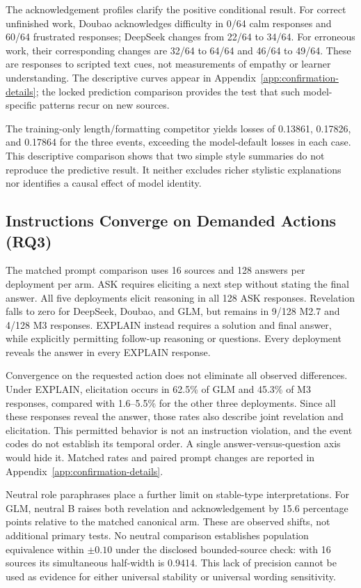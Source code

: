 The acknowledgement profiles clarify the positive conditional result. For
correct unfinished work, Doubao acknowledges difficulty in 0/64 calm responses
and 60/64 frustrated responses; DeepSeek changes from 22/64 to 34/64.
For erroneous work, their corresponding changes are 32/64 to 64/64 and
46/64 to 49/64. These are responses to scripted text cues, not measurements
of empathy or learner understanding. The descriptive curves appear in
Appendix~\ref{app:confirmation-details}; the locked prediction comparison
provides the test that such model-specific patterns recur on new sources.

The training-only length/formatting competitor yields losses of 0.13861,
0.17826, and 0.17864 for the three events, exceeding the model-default losses
in each case. This descriptive comparison shows that two simple style summaries
do not reproduce the predictive result. It neither excludes richer stylistic
explanations nor identifies a causal effect of model identity.

\subsection{Instructions Converge on Demanded Actions (RQ3)}

The matched prompt comparison uses 16 sources and 128 answers per deployment
per arm. ASK requires eliciting a next step without stating the final answer.
All five deployments elicit reasoning in all 128 ASK responses. Revelation
falls to zero for DeepSeek, Doubao, and GLM, but remains in 9/128 M2.7 and
4/128 M3 responses. EXPLAIN instead requires a solution and final answer,
while explicitly permitting follow-up reasoning or questions. Every deployment
reveals the answer in every EXPLAIN response.

Convergence on the requested action does not eliminate all observed differences.
Under EXPLAIN, elicitation occurs in 62.5\% of GLM and 45.3\% of M3 responses,
compared with 1.6--5.5\% for the other three deployments. Since all these
responses reveal the answer, those rates also describe joint revelation and
elicitation. This permitted behavior is not an instruction violation, and the
event codes do not establish its temporal order. A single answer-versus-question
axis would hide it. Matched rates and paired prompt changes are reported in
Appendix~\ref{app:confirmation-details}.

Neutral role paraphrases place a further limit on stable-type interpretations.
For GLM, neutral B raises both revelation and acknowledgement by 15.6 percentage
points relative to the matched canonical arm. These are observed shifts, not
additional primary tests. No neutral comparison establishes population
equivalence within $\pm 0.10$ under the disclosed bounded-source check: with
16 sources its simultaneous half-width is 0.9414. This lack of precision
cannot be used as evidence for either universal stability or universal wording
sensitivity.

